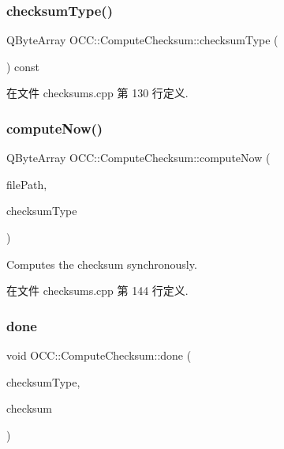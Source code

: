 \subsubsection{\texorpdfstring{checksum\+Type()}{checksumType()}}
{\footnotesize\ttfamily Q\+Byte\+Array O\+C\+C\+::\+Compute\+Checksum\+::checksum\+Type (\begin{DoxyParamCaption}{ }\end{DoxyParamCaption}) const}



在文件 checksums.\+cpp 第 130 行定义.

\mbox{\label{class_o_c_c_1_1_compute_checksum_a67b5ce48ee0cca21cbe48a34b8fb9dd8}} 
\subsubsection{\texorpdfstring{compute\+Now()}{computeNow()}}
{\footnotesize\ttfamily Q\+Byte\+Array O\+C\+C\+::\+Compute\+Checksum\+::compute\+Now (\begin{DoxyParamCaption}\item[{const Q\+String \&}]{file\+Path,  }\item[{const Q\+Byte\+Array \&}]{checksum\+Type }\end{DoxyParamCaption})\hspace{0.3cm}{\ttfamily [static]}}

Computes the checksum synchronously. 

在文件 checksums.\+cpp 第 144 行定义.

\mbox{\label{class_o_c_c_1_1_compute_checksum_a01c9dfa1598209e73ef617c758831e72}} 
\subsubsection{\texorpdfstring{done}{done}}
{\footnotesize\ttfamily void O\+C\+C\+::\+Compute\+Checksum\+::done (\begin{DoxyParamCaption}\item[{const Q\+Byte\+Array \&}]{checksum\+Type,  }\item[{const Q\+Byte\+Array \&}]{checksum }\end{DoxyParamCaption})\hspace{0.3cm}{\ttfamily [signal]}}

